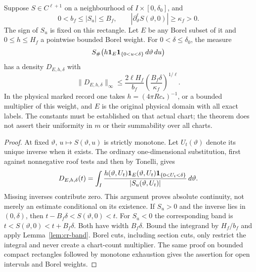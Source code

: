 \begin{theorem}
\label{thm:cr-finite-type}
Suppose $S\in C^{\ell+1}$ on a neighbourhood of
$I\times[0,\delta_0]$, and
\[
 0<b_f\le |S_u|\le B_f,\qquad
 |\partial_\vartheta^\ell S(\vartheta,0)|\ge\kappa_f>0.
\]
The sign of $S_u$ is fixed on this rectangle. Let $E$ be any Borel
subset of it and $0\le h\le H_f$ a pointwise bounded Borel weight.
For $0<\delta\le\delta_0$, the measure
\[
 S_\#\bigl(h\mathbf1_E\mathbf1_{\{0<u<\delta\}}
                         \,d\vartheta\,du\bigr)
\]
has a density $D_{E,h,\delta}$ with
\begin{equation}\label{eq:cr-finite-type}
 \|D_{E,h,\delta}\|_\infty
 \le\frac{2\ell H_f}{b_f}
                  \left(\frac{B_f\delta}{\kappa_f}\right)^{1/\ell}.
\end{equation}
In the physical marked record one takes
$h=(4\pi Rc_*)^{-1}$, or a bounded multiplier of this weight, and
$E$ is the original physical domain with all exact labels. The
constants must be established on that actual chart; the theorem
does not assert their uniformity in $m$ or their summability over
all charts.
\end{theorem}
\begin{proof}
At fixed $\vartheta$, $u\mapsto S(\vartheta,u)$ is strictly
monotone. Let $U_t(\vartheta)$ denote its unique inverse when it
exists. The ordinary one-dimensional substitution, first against
nonnegative roof tests and then by Tonelli, gives
\[
 D_{E,h,\delta}(t)=\int_I
 \frac{h(\vartheta,U_t)\mathbf1_E(\vartheta,U_t)
                 \mathbf1_{\{0<U_t<\delta\}}}
      {|S_u(\vartheta,U_t)|}\,d\vartheta.
\]
Missing inverses contribute zero. This argument proves absolute
continuity, not merely an estimate conditional on its existence.
If $S_u>0$ and the inverse lies in $(0,\delta)$, then
$t-B_f\delta<S(\vartheta,0)<t$. For $S_u<0$ the corresponding
band is $t<S(\vartheta,0)<t+B_f\delta$. Both have width
$B_f\delta$. Bound the integrand by $H_f/b_f$ and apply
Lemma~\ref{lem:cr-band}. Borel cuts, including section cuts, only
restrict the integral and never create a chart-count multiplier.
The same proof on bounded compact rectangles followed by monotone
exhaustion gives the assertion for open intervals and Borel weights.
\end{proof}

